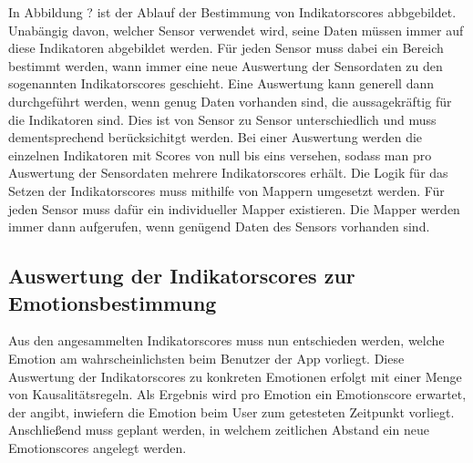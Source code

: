 In Abbildung ? ist der Ablauf der Bestimmung von Indikatorscores abbgebildet. Unabängig davon, welcher Sensor verwendet wird, seine Daten müssen immer auf diese Indikatoren abgebildet werden. Für jeden Sensor muss dabei ein Bereich bestimmt werden, wann immer eine neue Auswertung der Sensordaten zu den sogenannten Indikatorscores geschieht. Eine Auswertung kann generell dann durchgeführt werden, wenn genug Daten vorhanden sind, die aussagekräftig für die Indikatoren sind. Dies ist von Sensor zu Sensor unterschiedlich und muss dementsprechend berücksichitgt werden. \newline
Bei einer Auswertung werden die einzelnen Indikatoren mit Scores von null bis eins versehen, sodass man pro Auswertung der Sensordaten mehrere Indikatorscores erhält. Die Logik für das Setzen der Indikatorscores muss mithilfe von Mappern umgesetzt werden. Für jeden Sensor muss dafür ein individueller Mapper existieren. Die Mapper werden immer dann aufgerufen, wenn genügend Daten des Sensors vorhanden sind. \newline
\subsection{Auswertung der Indikatorscores zur Emotionsbestimmung}
Aus den angesammelten Indikatorscores muss nun entschieden werden, welche Emotion am wahrscheinlichsten beim Benutzer der App vorliegt. Diese Auswertung der Indikatorscores zu konkreten Emotionen erfolgt mit einer Menge von Kausalitätsregeln. Als Ergebnis wird pro Emotion ein Emotionscore erwartet, der angibt, inwiefern die Emotion beim User zum getesteten Zeitpunkt vorliegt. Anschließend muss geplant werden, in welchem zeitlichen Abstand ein neue Emotionscores angelegt werden.
